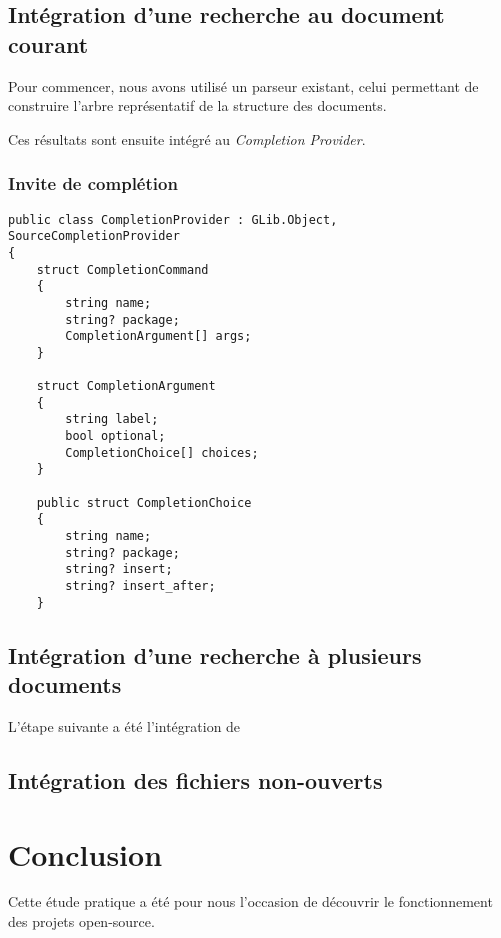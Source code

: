 \documentclass[a4paper,11pt]{report}
\begin{document}
\section{Intégration d'une recherche au document courant}
Pour commencer, nous avons utilisé un parseur existant, celui permettant de construire l'arbre représentatif de la structure des documents.

%

Ces résultats sont ensuite intégré au \textit{Completion Provider}.

\subsection{Invite de complétion}

\lstset{language=C}
\begin{lstlisting}[frame=single]
public class CompletionProvider : GLib.Object, SourceCompletionProvider
{
    struct CompletionCommand
    {
        string name;
        string? package;
        CompletionArgument[] args;
    }

    struct CompletionArgument
    {
        string label;
        bool optional;
        CompletionChoice[] choices;
    }

    public struct CompletionChoice
    {
        string name;
        string? package;
        string? insert;
        string? insert_after;
    }
\end{lstlisting}

\section{Intégration d'une recherche à plusieurs documents}

L'étape suivante a été l'intégration de 

\section{Intégration des fichiers non-ouverts}

\chapter{Conclusion}
Cette étude pratique a été pour nous l'occasion de découvrir le fonctionnement des projets open-source.
\end{document}
